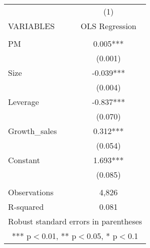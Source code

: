 \documentclass[]{article}
\begin{document}
\begin{tabular}{lc} \hline
 & (1) \\
VARIABLES & OLS Regression \\ \hline
 &  \\
PM & 0.005*** \\
 & (0.001) \\
Size & -0.039*** \\
 & (0.004) \\
Leverage & -0.837*** \\
 & (0.070) \\
Growth\_sales & 0.312*** \\
 & (0.054) \\
Constant & 1.693*** \\
 & (0.085) \\
 &  \\
Observations & 4,826 \\
 R-squared & 0.081 \\ \hline
\multicolumn{2}{c}{ Robust standard errors in parentheses} \\
\multicolumn{2}{c}{ *** p$<$0.01, ** p$<$0.05, * p$<$0.1} \\
\end{tabular}
\end{document}
